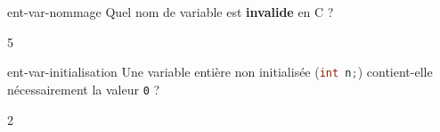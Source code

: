 \begin{question}{ent-var-nommage}
    Quel nom de variable est \textbf{invalide} en C ?
    \begin{multicols}{5}
        \begin{reponses}
        \end{reponses}
    \end{multicols}
\end{question}

\begin{question}{ent-var-initialisation}
    Une variable entière non initialisée (\lstinline[language=C]|int n;|) contient-elle nécessairement la valeur \texttt{0} ?
    \begin{multicols}{2}
        \begin{reponses}
        \end{reponses}
    \end{multicols}
\end{question}
